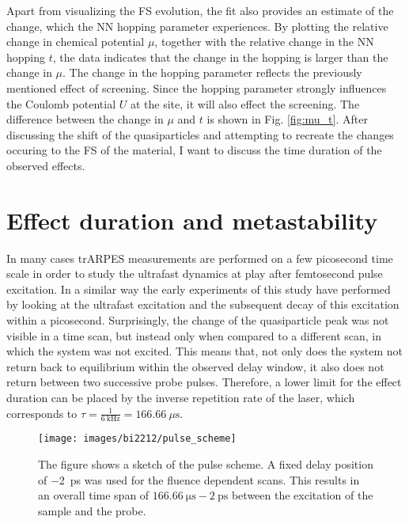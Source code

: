Apart from visualizing the FS evolution, the fit also provides an estimate of the change, which the NN hopping parameter experiences.
By plotting the relative change in chemical potential $\mu$, together with the relative change in the NN hopping $t$, the data indicates that the change in the hopping is larger than the change in $\mu$.
The change in the hopping parameter reflects the previously mentioned effect of screening.
Since the hopping parameter strongly influences the Coulomb potential $U$ at the  site, it will also effect the screening.
The difference between the change in $\mu$ and $t$ is shown in Fig. \ref{fig:mu_t}.
After discussing the shift of the quasiparticles and attempting to recreate the changes occuring to the FS of the material, I want to discuss the time duration of the observed effects.

\section{Effect duration and metastability}
\label{sec:meta}

In many cases trARPES measurements are performed on a few picosecond time scale in order to study the ultrafast dynamics at play after femtosecond pulse excitation.
In a similar way the early experiments of this study have performed by looking at the ultrafast excitation and the subsequent decay of this excitation within a picosecond.
Surprisingly, the change of the quasiparticle peak was not visible in a time scan, but instead only when compared to a different scan, in which the system was not excited.
This means that, not only does the system not return back to equilibrium within the observed delay window, it also does not return between two successive probe pulses.
Therefore, a lower limit for the effect duration can be placed by the inverse repetition rate of the laser, which corresponds to $\tau=\frac{1}{\qty{6}{\kilo\hertz}}=\qty{166.66}{\mu\second}$.

\begin{figure}
	\centering
	\texttt{[image: images/bi2212/pulse\_scheme]}
	\caption{The figure shows a sketch of the pulse scheme. A fixed delay position of \qty{-2}{\pico\second} was used for the fluence dependent scans. This results in an overall time span of $\qty{166.66}{\micro\second}-\qty{2}{\pico\second}$ between the excitation of the sample and the probe.}
	\label{fig:pulsescheme}
\end{figure}

